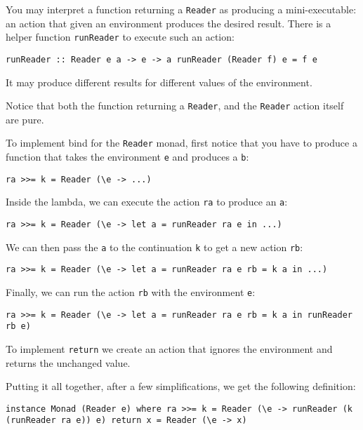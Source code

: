 You may interpret a function returning a \texttt{Reader} as producing a
mini-executable: an action that given an environment produces the
desired result. There is a helper function \texttt{runReader} to execute
such an action:

\begin{verbatim}
runReader :: Reader e a -> e -> a runReader (Reader f) e = f e
\end{verbatim}

It may produce different results for different values of the
environment.

Notice that both the function returning a \texttt{Reader}, and the
\texttt{Reader} action itself are pure.

To implement bind for the \texttt{Reader} monad, first notice that you
have to produce a function that takes the environment \texttt{e} and
produces a \texttt{b}:

\begin{verbatim}
ra >>= k = Reader (\e -> ...)
\end{verbatim}

Inside the lambda, we can execute the action \texttt{ra} to produce an
\texttt{a}:

\begin{verbatim}
ra >>= k = Reader (\e -> let a = runReader ra e in ...)
\end{verbatim}

We can then pass the \texttt{a} to the continuation \texttt{k} to get a
new action \texttt{rb}:

\begin{verbatim}
ra >>= k = Reader (\e -> let a = runReader ra e rb = k a in ...)
\end{verbatim}

Finally, we can run the action \texttt{rb} with the environment
\texttt{e}:

\begin{verbatim}
ra >>= k = Reader (\e -> let a = runReader ra e rb = k a in runReader rb e)
\end{verbatim}

To implement \texttt{return} we create an action that ignores the
environment and returns the unchanged value.

Putting it all together, after a few simplifications, we get the
following definition:

\begin{verbatim}
instance Monad (Reader e) where ra >>= k = Reader (\e -> runReader (k (runReader ra e)) e) return x = Reader (\e -> x)
\end{verbatim}

